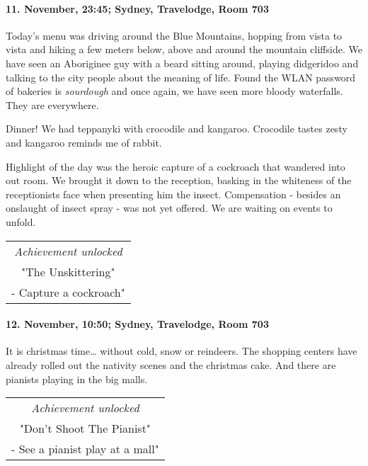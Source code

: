 \paragraph{11. November, 23:45; Sydney, Travelodge, Room 703}
Today's menu was driving around the Blue Mountains, hopping from vista to vista and hiking a few meters below, above and around the mountain cliffside.
We have seen an Aboriginee guy with a beard sitting around, playing didgeridoo and talking to the city people about the meaning of life.
Found the WLAN password of bakeries is \emph{sourdough} and once again, we have seen more bloody waterfalls.
They are everywhere.

Dinner!
We had teppanyki with crocodile and kangaroo.
Crocodile tastes zesty and kangaroo reminds me of rabbit.

Highlight of the day was the heroic capture of a cockroach that wandered into out room.
We brought it down to the reception, basking in the whiteness of the receptionists face when presenting him the insect.
Compensation - besides an onslaught of insect spray - was not yet offered.
We are waiting on events to unfold.

\begin{center}
\begin{tabular}{||c||}
\emph{Achievement unlocked}\\
"The Unskittering"\\
\multicolumn{1}{||p{0.8\textwidth}||}{\footnotesize - Capture a cockroach"} \\
\end{tabular}
\end{center}

\paragraph{12. November, 10:50; Sydney, Travelodge, Room 703}
It is christmas time\ldots{} without cold, snow or reindeers.
The shopping centers have already rolled out the nativity scenes and the christmas cake.
And there are pianists playing in the big malls.

\begin{center}
\begin{tabular}{||c||}
\emph{Achievement unlocked}\\
"Don't Shoot The Pianist"\\
\multicolumn{1}{||p{0.8\textwidth}||}{\footnotesize - See a pianist play at a mall"} \\
\end{tabular}
\end{center}


